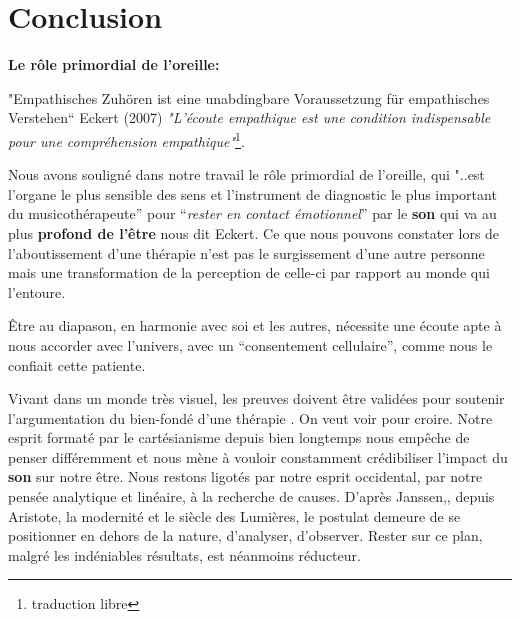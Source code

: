 \chapter{ Conclusion }

\textbf{Le rôle primordial de l'oreille:}

"Empathisches Zuhören ist eine unabdingbare Voraussetzung für empathisches Verstehen“ 
\autocite[p.46]{seminar_zuerich} Eckert (2007)
\textit{"L'écoute empathique est une condition indispensable
	pour une compréhension empathique"}\footnote{traduction libre}.


Nous avons souligné dans notre travail le rôle primordial de
l'oreille, qui "..est l'organe le plus sensible des
sens et l'instrument de diagnostic le plus important du
musicothérapeute'' pour ``\textit{rester en contact émotionnel}'' par le \textbf{son} qui va au plus 
\textbf{profond de
	l'être} nous dit Eckert.
Ce que nous pouvons constater lors de l'aboutissement
d'une thérapie n'est pas le surgissement d'une autre personne mais une transformation
de la perception de celle-ci par rapport au monde qui l'entoure.



Être au diapason, en harmonie avec soi et les autres, nécessite une
écoute apte à nous accorder avec l'univers, avec un \enquote {consentement cellulaire}, comme nous le 
confiait cette patiente.

Vivant dans un monde très visuel, les preuves doivent être
validées pour soutenir l'argumentation du bien-fondé d'une thérapie
\autocite[ch. II, pp. 105--106 ]{vrait_musicotherapie_2018}.
      On veut voir pour croire.
Notre esprit formaté par le cartésianisme depuis bien longtemps nous
empêche de penser différemment
et nous mène à vouloir constamment crédibiliser l'impact
du \textbf{son} sur notre être.
Nous restons
  ligotés par notre esprit occidental, par
  notre pensée analytique et linéaire, à la recherche de
  causes.
  D'après Janssen,\autocite[201]{van_eersel_cerveau}, depuis Aristote, la modernité et le
siècle des Lumières, le postulat demeure de se positionner en dehors
de la nature, d'analyser, d'observer.
Rester sur ce plan, malgré les
indéniables résultats, est néanmoins
réducteur.

